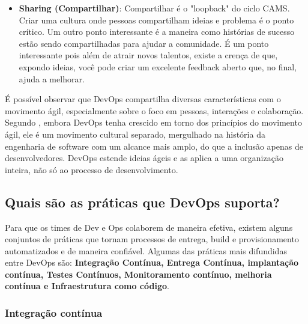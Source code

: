 \documentclass[twoside,english,brazilian]{UNISINOSartigo}
\begin{document}
\begin{itemize}
\item \textbf{Sharing (Compartilhar)}: Compartilhar é o "loopback" do ciclo CAMS. Criar uma cultura onde pessoas compartilham ideias e problema é o ponto crítico. Um outro ponto interessante é a maneira como histórias de sucesso estão sendo compartilhadas para ajudar a comunidade. É um ponto interessante pois além de atrair novos talentos, existe a crença de que, expondo ideias, você pode criar um excelente feedback aberto que, no final, ajuda a melhorar.
\end{itemize}
 
É possível observar que DevOps compartilha diversas características com o movimento ágil, especialmente sobre o foco em pessoas, interações e colaboração. Segundo \citep{Fallis2013}, embora DevOps tenha crescido em torno dos princípios do movimento ágil, ele é um movimento cultural separado, mergulhado na história da engenharia de software com um alcance mais amplo, do que a inclusão apenas de desenvolvedores. DevOps estende ideias ágeis e as aplica a uma organização inteira, não só ao processo de desenvolvimento.  
\subsection{Quais são as práticas que DevOps suporta? }
Para que os times de Dev e Ops colaborem de maneira efetiva, existem alguns conjuntos de práticas que tornam processos de entrega, build e provisionamento automatizados e de maneira confiável. Algumas das práticas mais difundidas entre DevOps são: \textbf{Integração Contínua, Entrega Contínua, implantação contínua, Testes Contínuos, Monitoramento contínuo, melhoria contínua
e Infraestrutura como código}.

\subsubsection{Integração contínua}
\end{document}

